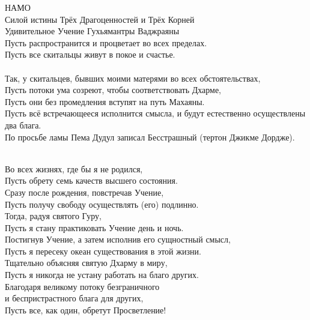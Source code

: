 
НАМО\\
Силой истины Трёх Драгоценностей и Трёх Корней\\
Удивительное Учение Гухьямантры Ваджраяны\\
Пусть распространится и процветает во всех пределах.\\
Пусть все скитальцы живут в покое и счастье.\\
\\
Так, у скитальцев, бывших моими матерями во всех обстоятельствах,\\
Пусть потоки ума созреют, чтобы соответствовать Дхарме,\\
Пусть они без промедления вступят на путь Махаяны.\\
Пусть всё встречающееся исполнится смысла, и будут естественно осуществлены два блага.\\
\scriptsize
По просьбе ламы Пема Дудул записал Бесстрашный (тертон Джикме Дордже).\\
\normalsize
\\


Во всех жизнях, где бы я не родился,\\
Пусть обрету семь качеств высшего состояния.\\
Сразу после рождения, повстречав Учение,\\
Пусть получу свободу осуществлять (его) подлинно.\\
Тогда, радуя святого Гуру,\\
Пусть я стану практиковать Учение день и ночь.\\
Постигнув Учение, а затем исполнив его сущностный смысл,\\
Пусть я пересеку океан существования в этой жизни.\\
Тщательно объясняя святую Дхарму в миру,\\
Пусть я никогда не устану работать на благо других.\\
Благодаря великому потоку безграничного\\
и беспристрастного блага для других,\\
Пусть все, как один, обретут Просветление!

\newpage
{}

